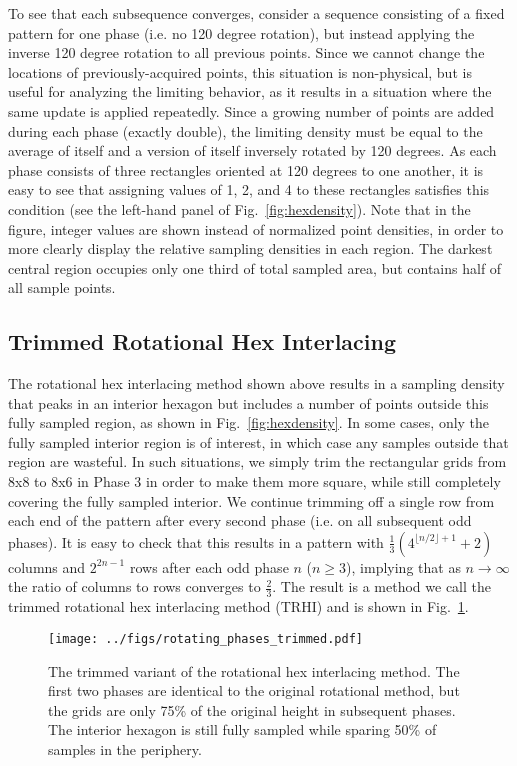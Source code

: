 \documentclass{article}
\newcommand{\reffig}[1]{Fig.~\ref{fig:#1}}
\begin{document}
To see that each subsequence converges, consider a sequence consisting of a
fixed pattern for one phase (i.e. no 120 degree rotation), but instead applying
the inverse 120 degree rotation to all previous points.
%
Since we cannot change the locations of previously-acquired points, this
situation is non-physical, but is useful for analyzing the limiting behavior,
as it results in a situation where the same update is applied repeatedly.
%
Since a growing number of points are added during each phase (exactly double),
the limiting density must be equal to the average of itself and a version of
itself inversely rotated by 120 degrees.
%
As each phase consists of three rectangles oriented at 120 degrees to one
another, it is easy to see that assigning values of 1, 2, and 4 to these
rectangles satisfies this condition (see the left-hand panel of
\reffig{hexdensity}).
%
Note that in the figure, integer values are shown instead of normalized point
densities, in order to more clearly display the relative sampling densities in
each region.
%
The darkest central region occupies only one third of total sampled area, but
contains half of all sample points.
%

\subsection{Trimmed Rotational Hex Interlacing}
\label{sec:trimmed}

The rotational hex interlacing method shown above results in a sampling density that peaks in an interior hexagon but includes a number of points outside this fully sampled region, as shown in \reffig{hexdensity}.
%
In some cases, only the fully sampled interior region is of interest, in which case any samples outside that region are wasteful.
%
In such situations, we simply trim the rectangular grids from 8x8 to 8x6 in
Phase 3 in order to make them more square, while still completely covering the
fully sampled interior.
%
We continue trimming off a single row from each end of the pattern after
every second phase (i.e. on all subsequent odd phases).
%
It is easy to check that this results in a pattern with
$\frac{1}{3}\left(4^{\lfloor n/2\rfloor + 1} + 2\right)$ columns and $2^{2n -
1}$ rows after each odd phase $n$ ($n\ge 3$), implying that as $n\to\infty$ the
ratio of columns to rows converges to $\frac{2}{3}$.
%
The result is a method we call the trimmed rotational hex interlacing method
(TRHI) and is shown in \reffig{trimmedrotatingphases}.


\begin{figure}[ht]
\centering
\texttt{[image: ../figs/rotating\_phases\_trimmed.pdf]}
\caption{
\label{fig:trimmedrotatingphases} 
The trimmed variant of the rotational hex interlacing method.
%
The first two phases are identical to the original rotational method, but the grids are only 75\% of the original height in subsequent phases.
%
The interior hexagon is still fully sampled while sparing 50\% of samples in the periphery.
}
\end{figure}
\end{document}
